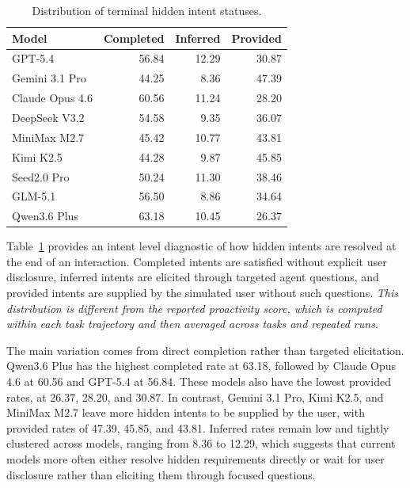 \documentclass{llmxive}
\begin{document}
\begin{table}[h]
\centering
\setlength{\tabcolsep}{8pt}
\begin{tabular}{lrrr}
\toprule[1.25pt]
\textbf{Model} &
\textbf{Completed} &
\textbf{Inferred} &
\textbf{Provided} \\
\midrule[0.75pt]
GPT-5.4 & 56.84 & 12.29 & 30.87 \\
Gemini 3.1 Pro & 44.25 & 8.36 & 47.39 \\
Claude Opus 4.6 & 60.56 & 11.24 & 28.20 \\
DeepSeek V3.2 & 54.58 & 9.35 & 36.07 \\
MiniMax M2.7 & 45.42 & 10.77 & 43.81 \\
Kimi K2.5 & 44.28 & 9.87 & 45.85 \\
Seed2.0 Pro & 50.24 & 11.30 & 38.46 \\
GLM-5.1 & 56.50 & 8.86 & 34.64 \\
Qwen3.6 Plus & 63.18 & 10.45 & 26.37 \\
\bottomrule[1.25pt]
\end{tabular}
\vspace{-4pt}
\caption{Distribution of terminal hidden intent statuses.}
\label{tab:hidden_intent_status}
\end{table}

Table~\ref{tab:hidden_intent_status} provides an intent level diagnostic of how hidden intents are resolved at the end of an interaction. Completed intents are satisfied without explicit user disclosure, inferred intents are elicited through targeted agent questions, and provided intents are supplied by the simulated user without such questions. \textit{This distribution is different from the reported proactivity score, which is computed within each task trajectory and then averaged across tasks and repeated runs.}

The main variation comes from direct completion rather than targeted elicitation. Qwen3.6 Plus has the highest completed rate at 63.18, followed by Claude Opus 4.6 at 60.56 and GPT-5.4 at 56.84. These models also have the lowest provided rates, at 26.37, 28.20, and 30.87. In contrast, Gemini 3.1 Pro, Kimi K2.5, and MiniMax M2.7 leave more hidden intents to be supplied by the user, with provided rates of 47.39, 45.85, and 43.81. Inferred rates remain low and tightly clustered across models, ranging from 8.36 to 12.29, which suggests that current models more often either resolve hidden requirements directly or wait for user disclosure rather than eliciting them through focused questions.
\end{document}

